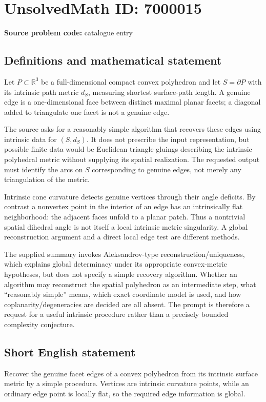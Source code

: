 \documentclass[11pt]{article}
\newcommand{\R}{\mathbb{R}}
\begin{document}
\section*{UnsolvedMath ID: 7000015}
\textbf{Source problem code:} catalogue entry
\subsection{Definitions and mathematical statement}
Let $P\subset\R^3$ be a full-dimensional compact convex polyhedron and let $S=\partial P$ with its intrinsic path metric $d_S$, measuring shortest surface-path length. A genuine edge is a one-dimensional face between distinct maximal planar facets; a diagonal added to triangulate one facet is not a genuine edge.

The source asks for a reasonably simple algorithm that recovers these edges using intrinsic data for $(S,d_S)$. It does not prescribe the input representation, but possible finite data would be Euclidean triangle gluings describing the intrinsic polyhedral metric without supplying its spatial realization. The requested output must identify the arcs on $S$ corresponding to genuine edges, not merely any triangulation of the metric.

Intrinsic cone curvature detects genuine vertices through their angle deficits. By contrast a nonvertex point in the interior of an edge has an intrinsically flat neighborhood: the adjacent faces unfold to a planar patch. Thus a nontrivial spatial dihedral angle is not itself a local intrinsic metric singularity. A global reconstruction argument and a direct local edge test are different methods.

The supplied summary invokes Aleksandrov-type reconstruction/uniqueness, which explains global determinacy under its appropriate convex-metric hypotheses, but does not specify a simple recovery algorithm. Whether an algorithm may reconstruct the spatial polyhedron as an intermediate step, what ``reasonably simple'' means, which exact coordinate model is used, and how coplanarity/degeneracies are decided are all absent. The prompt is therefore a request for a useful intrinsic procedure rather than a precisely bounded complexity conjecture.
\subsection{Short English statement}
Recover the genuine facet edges of a convex polyhedron from its intrinsic surface metric by a simple procedure. Vertices are intrinsic curvature points, while an ordinary edge point is locally flat, so the required edge information is global.
\end{document}
